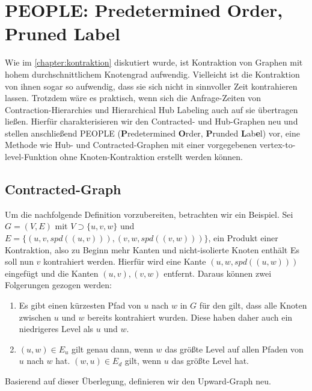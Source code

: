\chapter{PEOPLE: Predetermined Order, Pruned Label}\label{chapter:peopel}

Wie im \autoref{chapter:kontraktion} diskutiert wurde, ist Kontraktion von Graphen mit hohem durchschnittlichem Knotengrad aufwendig.
Vielleicht ist die Kontraktion von ihnen sogar so aufwendig, dass sie sich nicht in sinnvoller Zeit kontrahieren lassen.
Trotzdem wäre es praktisch, wenn sich die Anfrage-Zeiten von Contraction-Hierarchies und Hierarchical Hub Labeling auch auf sie übertragen ließen.
Hierfür charakterisieren wir den Contracted- und Hub-Graphen neu und stellen anschließend PEOPLE (\textbf{P}redetermined \textbf{O}rder, \textbf{P}runded \textbf{L}ab\textbf{e}l) vor, eine Methode wie Hub- und Contracted-Graphen mit einer vorgegebenen vertex-to-level-Funktion ohne Knoten-Kontraktion erstellt werden können.

\section{Contracted-Graph}

Um die nachfolgende Definition vorzubereiten, betrachten wir ein Beispiel.
Sei $G = (V, E)$ mit $V \supset \{ u, v, w \}$ und $E = \{ (u, v, {spd}((u, v))), (v, w, {spd}((v, w))) \}$, ein Produkt einer Kontraktion, also zu Beginn mehr Kanten und nicht-isolierte Knoten enthält
Es soll nun $v$ kontrahiert werden.
Hierfür wird eine Kante $(u, w, {spd}((u, w)))$ eingefügt und die Kanten $(u, v), (v, w)$ entfernt.
Daraus können zwei Folgerungen gezogen werden:

\begin{enumerate}
  \item
        Es gibt einen kürzesten Pfad von $u$ nach $w$ in $G$ für den gilt, dass alle Knoten zwischen $u$ und $w$ bereits kontrahiert wurden.
        Diese haben daher auch ein niedrigeres Level als $u$ und $w$.

  \item
        $(u, w) \in E_u$ gilt genau dann, wenn $w$ das größte Level auf allen Pfaden von $u$ nach $w$ hat.
        $(w, u) \in E_d$ gilt, wenn $u$ das größte Level hat.
\end{enumerate}

Basierend auf dieser Überlegung, definieren wir den Upward-Graph neu.

